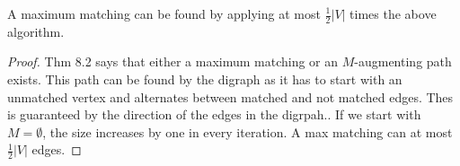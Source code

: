 \begin{thm}
A maximum matching can be found by applying at most $\frac{1}{2} |V| $ times the above algorithm.
\end{thm}
\begin{proof} Thm 8.2 %
says that either a maximum matching or an $M$-augmenting path exists. This path can be found by the digraph as it has to start with an unmatched vertex and alternates between matched and not matched edges. Thes is guaranteed by the direction of the edges in the digrpah.. If we start with $M = \emptyset$, the size increases by one in every iteration. A max matching can at most $\frac{1}{2} |V|$ edges.
\end{proof}

